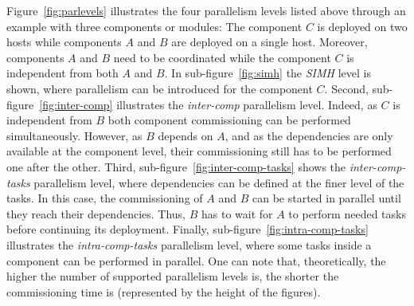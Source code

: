 Figure~\ref{fig:parlevels} illustrates the four parallelism levels listed above through an example with three components or modules: The component $C$ is deployed on two hosts while components $A$ and $B$ are deployed on a single host. Moreover, components $A$ and $B$ need to be coordinated while the component $C$ is independent from both $A$ and $B$. In sub-figure~\ref{fig:simh} the \emph{SIMH} level is shown, where parallelism can be introduced for the component $C$. Second, sub-figure~\ref{fig:inter-comp} illustrates the \emph{inter-comp} parallelism level. Indeed, as $C$ is independent from $B$ both component commissioning can be performed simultaneously. However, as $B$ depends on $A$, and as the dependencies are only available at the component level, their commissioning still has to be performed one after the other. Third, sub-figure~\ref{fig:inter-comp-tasks} shows the \emph{inter-comp-tasks} parallelism level, where dependencies can be defined at the finer level of the tasks. In this case, the commissioning of $A$ and $B$ can be started in parallel until they reach their dependencies. Thus, $B$ has to wait for $A$ to perform needed tasks before continuing its deployment. Finally, sub-figure~\ref{fig:intra-comp-tasks} illustrates the \emph{intra-comp-tasks} parallelism level, where some tasks inside a component can be performed in parallel. One can note that, theoretically, the higher the number of supported parallelism levels is, the shorter the commissioning time is (represented by the height of the figures).


